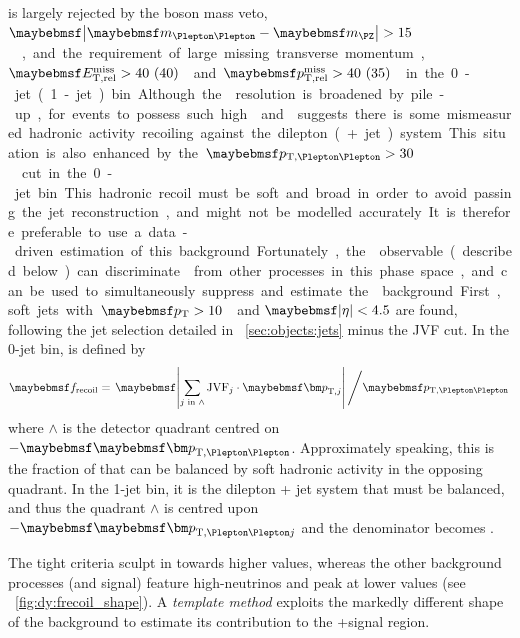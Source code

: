 \DYll is largely rejected by the \PZ boson mass veto, 
\unit{$\mods{\mll - \mZ} > 15$}{\GeV}, and the requirement of large missing transverse 
momentum, \unit{$\calometrel > 40~(40)$}{\GeV} and \unit{$\trackmetrel > 40~(35)$}{\GeV} in 
the 0-jet (1-jet) bin. Although the \met resolution is broadened by pile-up, for 
events to possess such high \calometrel and \trackmetrel suggests there is some mismeasured 
hadronic activity recoiling against the dilepton (+ jet) system. This situation is also 
enhanced by the \unit{$\ptll > 30$}{\GeV} cut in the 0-jet bin.

This hadronic recoil must be soft and broad in order to avoid passing the jet 
reconstruction, and might not be modelled accurately. It is therefore preferable to use 
a data-driven estimation of this background. Fortunately, the \frecoil observable 
(described below) can discriminate \DYll from other processes in this phase space, and 
can be used to simultaneously suppress and estimate the \DYll background.

First, soft jets with \unit{$\pt > 10$}{\GeV} and $\mods{\eta} < 4.5$ are found, 
following the jet selection detailed in \Section~\ref{sec:objects:jets} minus the JVF 
cut. In the 0-jet bin, \frecoil is defined by
\begin{equation}
	\frecoil = \left. \mods{\sum\limits_{j\text{ in }\wedge} \text{JVF}_{j} \cdot \bvec{p}_{\text{T,}j}} \, \middle/ \ptll \right.
	\label{eq:dy:frecoil}
\end{equation}
where $\wedge$ is the detector quadrant centred on $-\ptllvec$. Approximately speaking, 
this is the fraction of \ptll that can be balanced by soft hadronic activity in the 
opposing quadrant. In the 1-jet bin, it is the dilepton + jet system that must be balanced, 
and thus the quadrant $\wedge$ is centred upon $-\ptlljvec$ and the denominator becomes 
\ptllj.

The tight \met criteria sculpt \frecoil in \DYll towards higher values, whereas the other 
background processes (and signal) feature high-\pt neutrinos and peak at lower values 
(see \Figure~\ref{fig:dy:frecoil_shape}). A \textit{template method} exploits the 
markedly different \frecoil shape of the \DYll background to estimate its contribution to 
the \eech{}+\mmch signal region.

